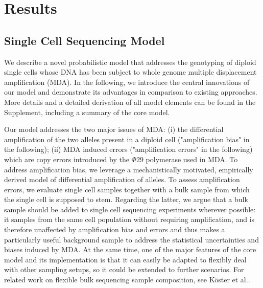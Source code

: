 \documentclass[12pt,inline]{wlscirep}
\begin{document}
\section{Results}

\subsection{Single Cell Sequencing Model}

We describe a novel probabilistic model that addresses the genotyping of diploid single cells whose DNA has been subject to whole genome multiple displacement amplification (MDA)\cite{dean_comprehensive_2002}.
In the following, we introduce the central innovations of our model and demonstrate its advantages in comparison to existing approaches.
More details and a detailed derivation of all model elements can be found in the Supplement, including a summary of the core model.

Our model addresses the two major issues of MDA: (i) the differential amplification of the two alleles present in a diploid cell ("amplification bias" in the following); (ii) MDA induced errors ("amplification errors" in the following) which are copy errors introduced by the $\Phi29$ polymerase used in MDA. To address amplification bias, we leverage a mechanistically motivated, empirically derived model of differential amplification of alleles.
To assess amplification errors, we evaluate single cell samples together with a bulk sample from which the single cell is supposed to stem.
Regarding the latter, we argue that a bulk sample should be added to single cell sequencing experiments wherever possible: it samples from the same cell population without requiring amplification, and is therefore unaffected by amplification bias and errors and thus makes a particularly useful background sample to address the statistical uncertainties and biases induced by MDA.
At the same time, one of the major features of the core model and its implementation is that it can easily be adapted to flexibly deal with other sampling setups, so it could be extended to further scenarios.
For related work on flexible bulk sequencing sample composition, see Köster et al.\cite{koster_varlociraptor_2020}.
\end{document}
